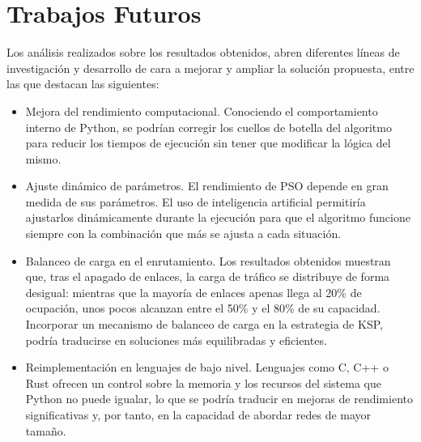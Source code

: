 \section{Trabajos Futuros}

Los análisis realizados sobre los resultados obtenidos, abren diferentes líneas de investigación y desarrollo de cara a mejorar y ampliar la solución propuesta, entre las que destacan las siguientes:

\begin{itemize}
    \item Mejora del rendimiento computacional. Conociendo el comportamiento interno de Python, se podrían corregir los cuellos de botella del algoritmo para reducir los tiempos de ejecución sin tener que modificar la lógica del mismo.
    \item Ajuste dinámico de parámetros. El rendimiento de PSO depende en gran medida de sus parámetros. El uso de inteligencia artificial permitiría ajustarlos dinámicamente durante la ejecución para que el algoritmo funcione siempre con la combinación que más se ajusta a cada situación.
    \item Balanceo de carga en el enrutamiento. Los resultados obtenidos muestran que, tras el apagado de enlaces, la carga de tráfico se distribuye de forma desigual: mientras que la mayoría de enlaces apenas llega al 20\% de ocupación, unos pocos alcanzan entre el 50\% y el 80\% de su capacidad. Incorporar un mecanismo de balanceo de carga en la estrategia de KSP, podría traducirse en soluciones más equilibradas y eficientes.
    \item Reimplementación en lenguajes de bajo nivel. Lenguajes como C, C++ o Rust ofrecen un control sobre la memoria y los recursos del sistema que Python no puede igualar, lo que se podría traducir en mejoras de rendimiento significativas y, por tanto, en la capacidad de abordar redes de mayor tamaño.
\end{itemize}